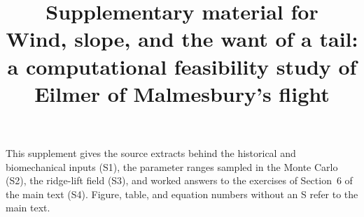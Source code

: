 \documentclass[11pt]{article}
\title{\bfseries Supplementary material for\\
Wind, slope, and the want of a tail:\\
a computational feasibility study of Eilmer of Malmesbury's flight}
\author{}
\date{}
\begin{document}
\maketitle

\noindent
This supplement gives the source extracts behind the historical and biomechanical
inputs (S1), the parameter ranges sampled in the Monte Carlo (S2), the ridge-lift field
(S3), and worked answers to the exercises of Section~6 of the main text (S4).
Figure, table, and equation numbers without an S refer to the main text.



\printbibliography
\end{document}
